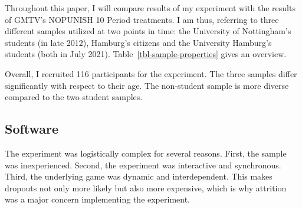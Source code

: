 \documentclass[
  authoryear,
  preprint,
  3p]{elsarticle}
\begin{document}
Throughout this paper, I will compare results of my experiment with the
results of GMTV's NOPUNISH 10 Period treatments. I am thus, referring to
three different samples utilized at two points in time: the University
of Nottingham's students (in late 2012), Hamburg's citizens and the
University Hamburg's students (both in July 2021).
Table~\ref{tbl-sample-properties} gives an overview.

\hypertarget{tbl-sample-properties}{}
\begin{table}[!htbp] \centering \renewcommand*{\arraystretch}{1.1}\caption{\label{tbl-sample-properties}Sample Properties }
\end{table}

Overall, I recruited 116 participants for the experiment. The three
samples differ significantly with respect to their age. The non-student
sample is more diverse compared to the two student samples.

\hypertarget{sec-software}{%
\subsection{Software}\label{sec-software}}

The experiment was logistically complex for several reasons. First, the
sample was inexperienced. Second, the experiment was interactive and
synchronous. Third, the underlying game was dynamic and interdependent.
This makes dropouts not only more likely but also more expensive, which
is why attrition was a major concern implementing the experiment.
\end{document}
